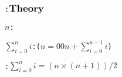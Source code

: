 \def\setsotherremovetwofn#1#2{{(#2 \setminus \{#1\})}}%
\def\setsotheraddtwofn#1#2{{(#2 \cup \{#1\})}}%
\def\setsotherdifferencetwofn#1#2{{(#1 \setminus #2)}}%
\def\setsothercomplementonefn#1{{\overline{#1}}}%
\def\setsotherintersectiontwofn#1#2{{(#1 \cap #2)}}%
\def\setsotheruniontwofn#1#2{{(#1 \cup #2)}}%
\def\setsotherstrictunderscoresubsetothertwofn#1#2{{(#1 \subset #2)}}%
\def\setsothersubsetothertwofn#1#2{{(#1 \subseteq #2)}}%
\def\setsothermembertwofn#1#2{{(#1 \in #2)}}%
\def\opohtwofn#1#2{{#1\circ#2}}%
\def\opdividetwofn#1#2{{#1/#2}}%
\def\optimestwofn#1#2{{#1\times#2}}%
\def\opdifferenceonefn#1{{-#1}}%
\def\opdifferencetwofn#1#2{{#1-#2}}%
\def\opplustwofn#1#2{{#1+#2}}%
\def\sumonefn#1{{\sum_{i = 0}^{#1} i}}%
\begin{alltt}
: \({\textbf{\large Theory}}\)

  \(n\):  \vspace*{\pvsdeclspacing}

  \(\sumonefn{n}\):   \pvskey{=} ( \(n\) \(=\) \(0\)  \(0\)  \(\opplustwofn{n}{\sumonefn{\opdifferencetwofn{n}{1}}}\) )
      \vspace*{\pvsdeclspacing}

  :  \(\sumonefn{n}\) \(=\) \(\opdividetwofn{(\optimestwofn{n}{(\opplustwofn{n}{1})})}{2}\)\vspace*{\pvsdeclspacing}

  \end{alltt}
